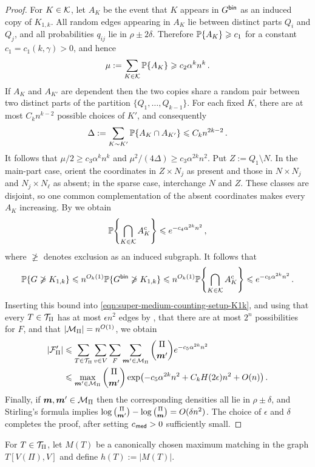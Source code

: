 \begin{proof}
For $K\in{\mathcal K}$, let $A_K$ be the event that $K$ appears in $G^{\mathsf{bin}}$ as an induced copy of $K_{1,k}$. All random edges appearing in $A_K$ lie between distinct parts $Q_i$ and $Q_j$, and all probabilities $q_{ij}$ lie in $\rho\pm2\delta$. Therefore ${\mathbb P}\{A_K\}\geqslant c_1$ for a constant $c_1=c_1(k,\gamma)>0$, and hence
$$\mu:=\sum_{K\in{\mathcal K}}{\mathbb P}\{A_K\}\geqslant c_2\alpha^kn^k\,.$$
If $A_K$ and $A_{K'}$ are dependent then the two copies share a random pair between two distinct parts of the partition $\{Q_1,\dots,Q_{k-1}\}$. For each fixed $K$, there are at most $C_kn^{k-2}$ possible choices of $K'$, and consequently
$$\Delta:=\sum_{K\sim K'}{\mathbb P}\{A_K\cap A_{K'}\}\leqslant C_kn^{2k-2}\,.$$
It follows that $\mu/2\geq c_3\alpha^kn^k$ and $\mu^2/(4\Delta)\geq c_3\alpha^{2k}n^2$. Put $Z:=Q_1\setminus N$. In the main-part case, orient the coordinates in $Z\times N_j$ as present and those in $N\times N_j$ and $N_j\times N_\ell$ as absent; in the sparse case, interchange $N$ and $Z$. These classes are disjoint, so one common complementation of the absent coordinates makes every $A_K$ increasing. By  we obtain
$${\mathbb P}\!\left\{\bigcap_{K\in{\mathcal K}}A_K^c\right\}\leqslant e^{-c_4\alpha^{2k}n^2}\,,$$
where $\not\geq$ denotes exclusion as an induced subgraph. It follows that
$${\mathbb P}\{G\not\geqslant K_{1,k}\}\leqslant n^{O_k(1)}{\mathbb P}\{G^{\mathsf{bin}}\not\geqslant K_{1,k}\}\leqslant n^{O_k(1)}{\mathbb P}\!\left\{\bigcap_{K\in{\mathcal K}}A_K^c\right\}\leqslant e^{-c_5\alpha^{2k}n^2}\,.$$
Inserting this bound into \eqref{eqn:super-medium-counting-setup-K1k}, and using that every $T\in{\mathcal T}_\Pi$ has at most $\epsilon n^2$ edges by , that there are at most $2^n$ possibilities for $F$, and that $|{\mathcal M}_\Pi|=n^{O(1)}$, we obtain
\begin{align*}
\lvert{\mathcal F}'_\Pi\rvert&\leqslant \sum_{T\in{\mathcal T}_\Pi}\sum_{v\in V}\sum_F\sum_{\boldsymbol{m}'\in{\mathcal M}_\Pi}\binom{\Pi}{\boldsymbol{m}'}e^{-c_5\alpha^{2k}n^2} \\
&\leqslant \max_{\boldsymbol{m}'\in{\mathcal M}_\Pi}\binom{\Pi}{\boldsymbol{m}'}\exp\!\left(-c_5\alpha^{2k}n^2+C_kH(2\epsilon)n^2+O(n)\right).
\end{align*}
Finally, if $\boldsymbol{m},\boldsymbol{m}'\in{\mathcal M}_\Pi$ then the corresponding densities all lie in $\rho\pm\delta$, and Stirling's formula implies $\log\binom{\Pi}{\boldsymbol{m}'}-\log\binom{\Pi}{\boldsymbol{m}}=O(\delta n^2)$. The choice of $\epsilon$ and $\delta$ completes the proof, after setting $c_{\hspace{0.2mm}\mathsf{med}}>0$ sufficiently small.
\end{proof}

For $T\in{\mathcal T}_\Pi$, let $M(T)$ be a canonically chosen maximum matching in the graph $T[V(\Pi),V]$ and define $h(T):=|M(T)|$.

